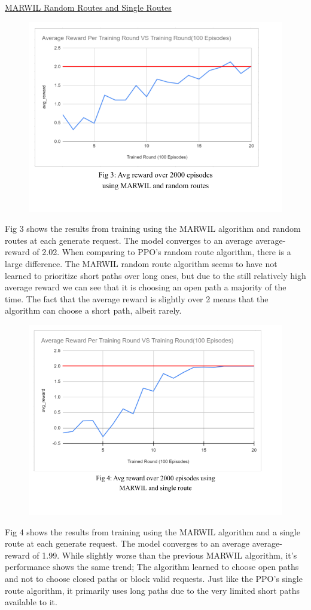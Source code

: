 \documentclass[conference]{IEEEtran}
\begin{document}
\begin{flushleft}
\underline{MARWIL Random Routes and Single Routes}
\begin{figure}[ht!]
    \includegraphics[width=.75\linewidth]{Final Paper Results And Graphs (4).png}
\end{figure}
\newline
Fig 3 shows the results from training using the MARWIL algorithm and random routes at each generate request. The model converges to an average average-reward of 2.02. When comparing to PPO's random route algorithm, there is a large difference. The MARWIL random route algorithm seems to have not learned to prioritize short paths over long ones, but due to the still relatively high average reward we can see that it is choosing an open path a majority of the time. The fact that the average reward is slightly over 2 means that the algorithm can choose a short path, albeit rarely.
\begin{figure}[ht!]
    \includegraphics[width=.75\linewidth]{Final Paper Results And Graphs (6).png}
\end{figure}
\newline
Fig 4 shows the results from training using the MARWIL algorithm and a single route at each generate request. The model converges to an average average-reward of 1.99. While slightly worse than the previous MARWIL algorithm, it's performance shows the same trend; The algorithm learned to choose open paths and not to choose closed paths or block valid requests. Just like the PPO's single route algorithm, it primarily uses long paths due to the very limited short paths available to it.
\end{flushleft}
\end{document}
